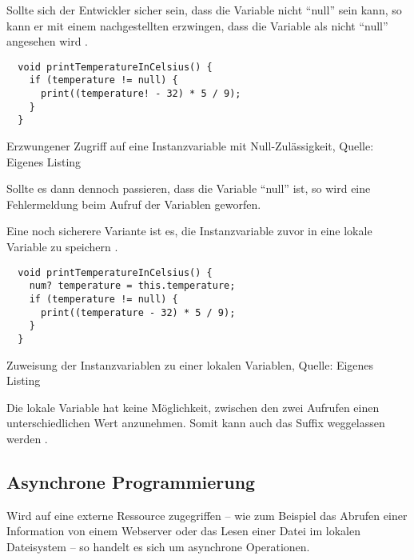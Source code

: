 Sollte sich der Entwickler sicher sein,
dass die Variable nicht \enquote{null} sein kann,
so kann er mit einem nachgestellten \IC{!} erzwingen,
dass die Variable als nicht \enquote{null} angesehen wird .

\ifIncludeFigures
  \begin{listing}[ht]
    \begin{verbatim}
  void printTemperatureInCelsius() {
    if (temperature != null) {
      print((temperature! - 32) * 5 / 9);
    }
  }
    \end{verbatim}
    \caption[Erzwungener Zugriff auf eine Instanzvariable mit Null-Zulässigkeit]{Erzwungener Zugriff auf eine Instanzvariable mit Null-Zulässigkeit, Quelle: Eigenes Listing}
    \label{lst:printTemperatureInCelsiusLocalVariableForceNullCheck}
  \end{listing}
\fi

Sollte es dann dennoch passieren, dass die Variable \enquote{null} ist, so wird eine Fehlermeldung beim Aufruf der Variablen geworfen.



Eine noch sicherere Variante ist es, die Instanzvariable zuvor in eine lokale Variable zu speichern .


\ifIncludeFigures
  \begin{listing}[ht]
    \begin{verbatim}
  void printTemperatureInCelsius() {
    num? temperature = this.temperature;
    if (temperature != null) {
      print((temperature - 32) * 5 / 9);
    }
  }
    \end{verbatim}
    \caption[Zuweisung der Instanzvariablen zu einer lokalen Variablen]{Zuweisung der Instanzvariablen zu einer lokalen Variablen, Quelle: Eigenes Listing}
    \label{lst:printTemperatureInCelsiusLocalVariable}
  \end{listing}
\fi

Die lokale Variable hat keine Möglichkeit, zwischen den zwei Aufrufen einen unterschiedlichen Wert anzunehmen.
Somit kann auch das Suffix \IC{!} weggelassen werden .



\subsection{Asynchrone Programmierung}

Wird auf eine externe Ressource zugegriffen -- wie zum Beispiel das Abrufen einer Information von einem Webserver oder das Lesen einer Datei im lokalen Dateisystem -- so handelt es sich um asynchrone Operationen.

